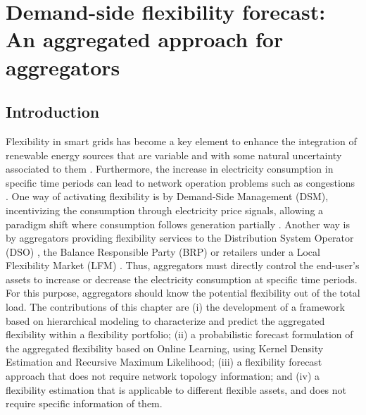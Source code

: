 \chapter{Demand-side flexibility forecast: An aggregated approach for aggregators}
\label{ChapterAggFlexForecast}

\section{Introduction}
Flexibility in smart grids has become a key element to enhance the integration of renewable energy sources  that  are  variable and  with some  natural  uncertainty  associated  to  them \cite{Ulbig2015, Goutte2019}. Furthermore, the increase in electricity consumption in specific time periods can lead to network operation problems such as congestions \cite{CEDEC2018, LaurA.Nieto-MartinJ.BunnD.Vicente-Pastor2019}. One way of activating flexibility is by Demand-Side Management (DSM), incentivizing the consumption through electricity price signals, allowing a paradigm shift where consumption follows generation partially \cite{Strbac2008}. Another way is by aggregators providing flexibility services to the Distribution System Operator (DSO) \cite{MUNNE-COLLADO2019}, the Balance Responsible Party (BRP) or retailers under a Local Flexibility Market (LFM) \cite{Olivella-Rosell2018, Heinrich2020}. Thus, aggregators must directly control the end-user's assets to increase or decrease the electricity consumption at specific time periods. For this purpose, aggregators should know the potential flexibility out of the total load. 
The contributions of this chapter are (i) the development of a framework based on hierarchical modeling to characterize and predict the aggregated flexibility within a flexibility portfolio; (ii) a probabilistic forecast formulation of the aggregated flexibility based on Online Learning, using Kernel Density Estimation and Recursive Maximum Likelihood; (iii) a flexibility forecast approach that does not require network topology information; and (iv) a flexibility estimation that is applicable to different flexible assets, and does not require specific information of them. 

